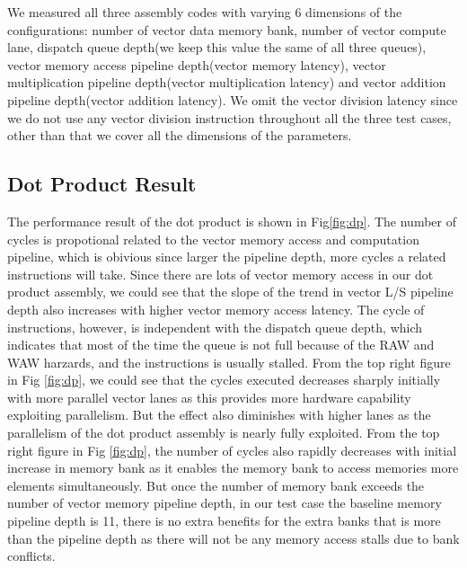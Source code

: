 \documentclass[conference]{IEEEtran}
\begin{document}
We measured all three assembly codes with varying 6 dimensions of the configurations: number of vector data memory bank, number of vector compute lane, dispatch queue depth(we keep this value the same of all three queues), vector memory access pipeline depth(vector memory latency), vector multiplication pipeline depth(vector multiplication latency) and vector addition pipeline depth(vector addition latency). We omit the vector division latency since we do not use any vector division instruction throughout all the three test cases, other than that we cover all the dimensions of the parameters.

\subsection{Dot Product Result}
The performance result of the dot product is shown in Fig\ref{fig:dp}. The number of cycles is propotional related to the vector memory access and computation pipeline, which is obivious since larger the pipeline depth, more cycles a related instructions will take. Since there are lots of vector memory access in our dot product assembly, we could see that the slope of the trend in vector L/S pipeline depth also increases with higher vector memory access latency. The cycle of instructions, however, is independent with the dispatch queue depth, which indicates that most of the time the queue is not full because of the RAW and WAW harzards, and the instructions is usually stalled. From the top right figure in Fig \ref{fig:dp}, we could see that the cycles executed decreases sharply initially with more parallel vector lanes as this provides more hardware capability exploiting parallelism. But the effect also diminishes with higher lanes as the parallelism of the dot product assembly is nearly fully exploited. From the top right figure in Fig \ref{fig:dp}, the number of cycles also rapidly decreases with initial increase in memory bank as it enables the memory bank to access memories more elements simultaneously. But once the number of memory bank exceeds the number of vector memory pipeline depth, in our test case the baseline memory pipeline depth is 11, there is no extra benefits for the extra banks that is more than the pipeline depth as there will not be any memory access stalls due to bank conflicts. 
\end{document}
